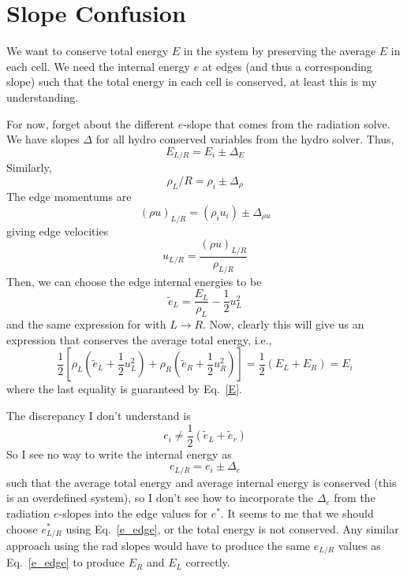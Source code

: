 \documentclass[preprint,12pt]{elsarticle}
\begin{document}
\section{Slope Confusion}

We want to conserve total energy $E$ in the system by preserving the average $E$ in
each cell.  We need the internal energy $e$ at edges (and thus a
corresponding slope) such that the total energy in each cell is conserved, at least
this is my understanding.

For now, forget about the different $e$-slope that comes from the radiation solve. We have
slopes $\Delta$ for all hydro conserved variables from the hydro solver. Thus,
\begin{equation}\label{E}
    E_{L/R} = E_i \pm \Delta_E
\end{equation}
Similarly, 
\begin{equation}
    \rho_L/R = \rho_i \pm \Delta_\rho
\end{equation}
The edge momentums are 
\begin{equation}
    (\rho u)_{L/R} = (\rho_i u_i) \pm \Delta_{\rho u}
\end{equation}
giving edge velocities 
\begin{equation}
    u_{L/R} = \frac{(\rho u)_{L/R}}{  \rho_{L/R} }
\end{equation}
Then, we can choose the edge internal energies to be
\begin{equation}\label{e_edge}
    \tilde e_{L} = \frac{E_L}{\rho_L} - \frac{1}{2} u_L^2
\end{equation}
and the same expression for with $L\rightarrow R$. Now, clearly this will give us an expression that
conserves the average total energy, i.e.,
\begin{equation}
    \frac{1}{2}\left[\rho_L(\tilde e_L + \frac{1}{2} u_L^2) + \rho_R(\tilde e_R + \frac{1}{2}
    u_R^2)\right]  = \frac{1}{2}(E_L + E_R) = E_i
\end{equation}
where the last equality is guaranteed by Eq.~\eqref{E}. 

The discrepancy I don't understand is
\begin{equation}
  e_i \neq \frac{1}{2}\left(  \tilde{e}_L + \tilde{e}_r \right)
\end{equation}
So I see no way to write the internal energy as
\begin{equation}
    e_{L/R} = e_i \pm \Delta_e
\end{equation}
such that the average total energy and average internal energy is conserved (this is an
overdefined system), so I don't see how to incorporate the $\Delta_e$ from the
radiation $e$-slopes into the edge values for $e^*$. It seems to me that we should
choose $e_{L/R}^*$ using Eq.~\eqref{e_edge}, or the total energy is not conserved.
Any similar approach using the rad slopes would have to produce the same $e_{L/R}$
values as Eq.~\eqref{e_edge} to
produce $E_R$ and $E_L$ correctly.
\end{document}
